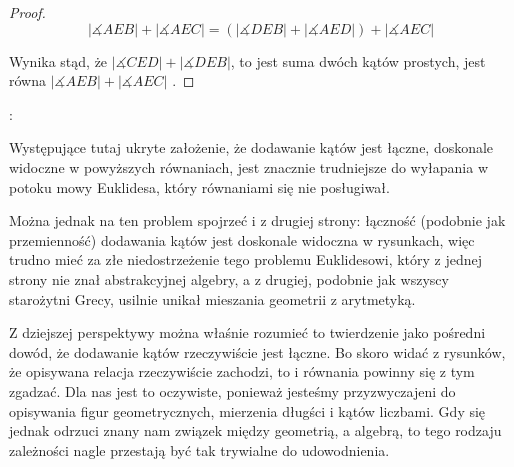 \documentclass[12pt, a4paper]{scrartcl}
\begin{document}
\begin{theorem}
\begin{proof}
        \[ |\measuredangle AEB| + |\measuredangle AEC| = (|\measuredangle DEB|
            + |\measuredangle AED|) + |\measuredangle AEC| \]

        Wynika stąd, że \(|\measuredangle CED| + |\measuredangle DEB|\), to jest
        suma dwóch kątów prostych, jest równa \(|\measuredangle AEB| +
        |\measuredangle AEC|\) .
    \end{proof}
    :

      Występujące tutaj ukryte założenie, że dodawanie kątów jest łączne,
      doskonale widoczne w powyższych równaniach, jest znacznie trudniejsze
      do wyłapania w potoku mowy Euklidesa, który równaniami się nie
      posługiwał.

      Można jednak na ten problem spojrzeć i z drugiej strony: łączność
      (podobnie jak przemienność) dodawania kątów jest doskonale widoczna
      w rysunkach, więc trudno mieć za złe niedostrzeżenie tego problemu
      Euklidesowi, który z jednej strony nie znał abstrakcyjnej algebry, a
      z drugiej, podobnie jak wszyscy starożytni Grecy, usilnie unikał
      mieszania geometrii z arytmetyką.

      Z dziejszej perspektywy można właśnie rozumieć to twierdzenie jako
      pośredni dowód, że dodawanie kątów rzeczywiście jest łączne. Bo skoro
      widać z rysunków, że opisywana relacja rzeczywiście zachodzi, to i
      równania powinny się z tym zgadzać. Dla nas jest to oczywiste, ponieważ
      jesteśmy przyzwyczajeni do opisywania figur geometrycznych, mierzenia
      długści i kątów liczbami. Gdy się jednak odrzuci znany nam związek między
      geometrią, a algebrą, to tego rodzaju zależności nagle przestają być tak
      trywialne do udowodnienia.
\end{theorem}
\end{document}
